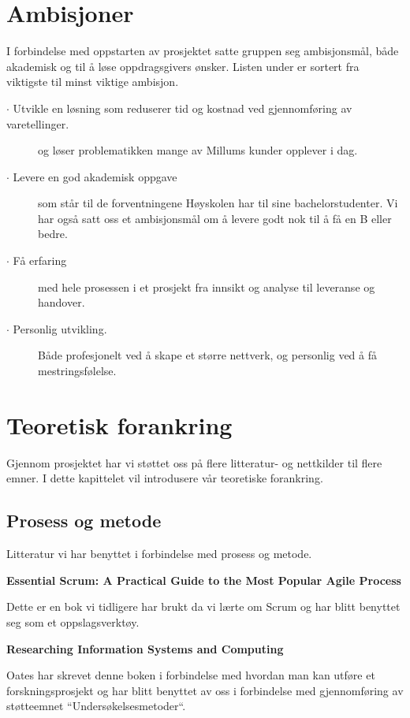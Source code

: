 \section{\textbf{Ambisjoner}} \label{Ambisjoner}
I forbindelse med oppstarten av prosjektet satte gruppen seg ambisjonsmål, både akademisk og til å løse oppdragsgivers ønsker. Listen under er sortert fra viktigste til minst viktige ambisjon.

\begin{description}
    \item[$\cdot$ Utvikle en løsning som reduserer tid og kostnad ved gjennomføring av varetellinger.] og løser problematikken mange av Millums kunder opplever i dag.
    \item[$\cdot$ Levere en god akademisk oppgave]som står til de forventningene Høyskolen har til sine bachelorstudenter. Vi har også satt oss et ambisjonsmål om å levere godt nok til å få en B eller bedre.
    \item[$\cdot$ Få erfaring]med hele prosessen i et prosjekt fra innsikt og analyse til leveranse og handover.
    \item[$\cdot$ Personlig utvikling.]Både profesjonelt ved å skape et større nettverk, og personlig ved å få mestringsfølelse.
\end{description}

\section{\textbf{Teoretisk forankring}} \label{TeoretiskForankring}

Gjennom prosjektet har vi støttet oss på flere litteratur- og nettkilder til flere emner. I dette kapittelet vil introdusere vår teoretiske forankring. 

\subsection{\textbf{Prosess og metode}}
Litteratur vi har benyttet i forbindelse med prosess og metode.

\begin{description}
    \item \textbf{Essential Scrum: A Practical Guide to the Most Popular Agile Process}
     
     Dette er en bok vi tidligere har brukt da vi lærte om Scrum og har blitt benyttet seg som et oppslagsverktøy.
    
    \item \textbf{Researching Information Systems and Computing}
    
     Oates har skrevet denne boken i forbindelse med hvordan man kan utføre et forskningsprosjekt og har blitt benyttet av oss i forbindelse med gjennomføring av støtteemnet ``Undersøkelsesmetoder``.

\end{description}



